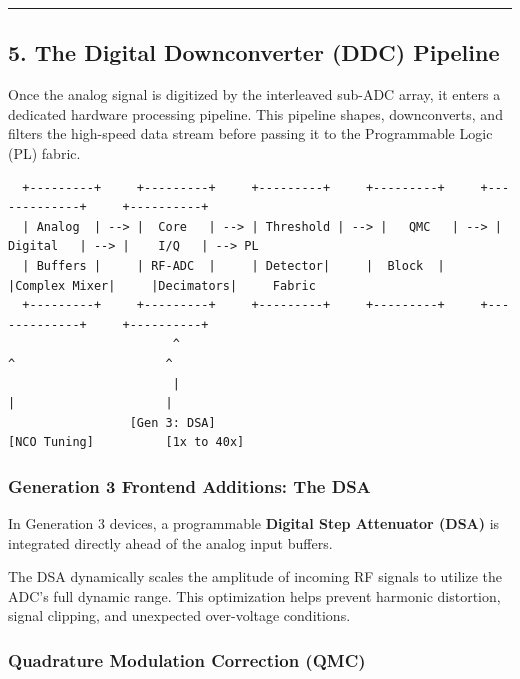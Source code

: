 \documentclass[
]{article}
\begin{document}
\begin{center}\rule{0.5\linewidth}{0.5pt}\end{center}

\subsection{5. The Digital Downconverter (DDC)
Pipeline}\label{the-digital-downconverter-ddc-pipeline}

Once the analog signal is digitized by the interleaved sub-ADC array, it
enters a dedicated hardware processing pipeline. This pipeline shapes,
downconverts, and filters the high-speed data stream before passing it
to the Programmable Logic (PL) fabric.

\begin{verbatim}
  +---------+     +---------+     +---------+     +---------+     +-------------+     +----------+
  | Analog  | --> |  Core   | --> | Threshold | --> |   QMC   | --> |   Digital   | --> |    I/Q   | --> PL
  | Buffers |     | RF-ADC  |     | Detector|     |  Block  |     |Complex Mixer|     |Decimators|     Fabric
  +---------+     +---------+     +---------+     +---------+     +-------------+     +----------+
                       ^                                                 ^                     ^
                       |                                                 |                     |
                 [Gen 3: DSA]                                      [NCO Tuning]          [1x to 40x]
\end{verbatim}

\subsubsection{Generation 3 Frontend Additions: The
DSA}\label{generation-3-frontend-additions-the-dsa}

In Generation 3 devices, a programmable \textbf{Digital Step Attenuator
(DSA)} is integrated directly ahead of the analog input buffers.

The DSA dynamically scales the amplitude of incoming RF signals to
utilize the ADC's full dynamic range. This optimization helps prevent
harmonic distortion, signal clipping, and unexpected over-voltage
conditions.

\subsubsection{Quadrature Modulation Correction
(QMC)}\label{quadrature-modulation-correction-qmc}
\end{document}
